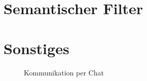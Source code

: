 \documentclass[german, 12pt]{book}
\begin{document}
\chapter{Semantischer Filter}


\chapter{Sonstiges}

\begin{figure}[H]
	\centering
	\hspace*{1cm}
	\caption{Kommunikation per Chat}
	\label{fig:communication}
\end{figure}
\end{document}
